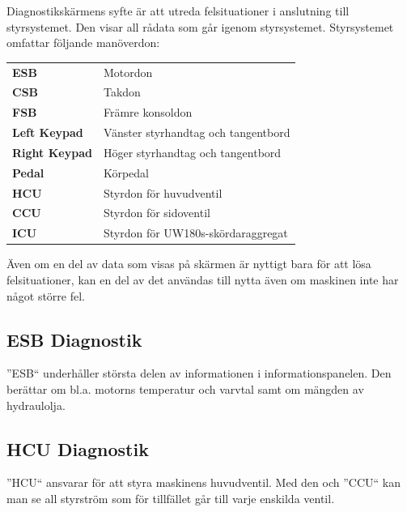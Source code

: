 \documentclass[12pt,a4paper,finnish]{uvmanual}
\begin{document}
Diagnostikskärmens syfte är att utreda felsituationer i anslutning till styrsystemet. Den visar all rådata som går igenom styrsystemet. Styrsystemet omfattar följande manöverdon:

\begin{tabular}{ L{0.2\textwidth} L{0.66\textwidth} }
\textbf{ESB} & Motordon \\
\textbf{CSB} & Takdon \\
\textbf{FSB} & Främre konsoldon \\
\textbf{Left Keypad} & Vänster styrhandtag och tangentbord \\
\textbf{Right Keypad} & Höger styrhandtag och tangentbord \\
\textbf{Pedal} & Körpedal \\
\textbf{HCU} & Styrdon för huvudventil \\
\textbf{CCU} & Styrdon för sidoventil \\
\textbf{ICU} & Styrdon för UW180s-skördaraggregat  \\
\end{tabular}




Även om en del av data som visas på skärmen är nyttigt bara för att lösa felsituationer, kan en del av det användas till nytta även om maskinen inte har något större fel.

\FloatBarrier
\subsection{ESB Diagnostik}\label{ch:system_diagnostics_msb}


''ESB`` underhåller största delen av informationen i informationspanelen. Den berättar om bl.a. motorns temperatur och varvtal samt om mängden av hydraulolja.

\FloatBarrier
\subsection{HCU Diagnostik}\label{ch:system_diagnostics_ecu}


''HCU`` ansvarar för att styra maskinens huvudventil. Med den och ''CCU`` kan man se all styrström som för tillfället går till varje enskilda ventil.
\end{document}
